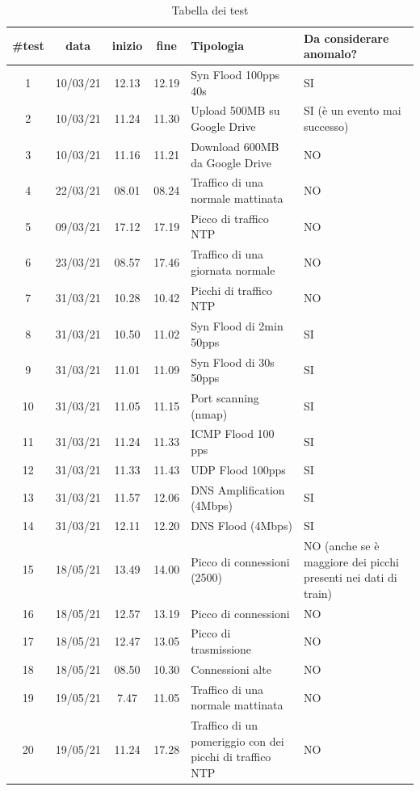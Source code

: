\FloatBarrier
\begin{table}
    \begin{tabularx}{\textwidth}{||c c c c X X||} 
        \hline
        \#test & data  & inizio & fine & Tipologia & Da considerare anomalo? \\ [0.5ex] 
        \hline\hline
        1 & 10/03/21 & 12.13 & 12.19 & Syn Flood 100pps 40s & SI\\ 
        \hline
        2 & 10/03/21 & 11.24 & 11.30
         & Upload 500MB su Google Drive & SI (è un evento mai successo)\\ 
        \hline
        3 & 10/03/21 & 11.16 & 11.21 & Download 600MB da Google Drive & NO\\ 
        \hline 
        4 & 22/03/21 & 08.01 & 08.24 & Traffico di una normale mattinata & NO\\
        \hline
        5 & 09/03/21 & 17.12 & 17.19 & Picco di traffico NTP & NO\\
        \hline
        6 & 23/03/21 & 08.57 & 17.46
         & Traffico di una giornata normale & NO\\ 
        \hline
        7 & 31/03/21 & 10.28 & 10.42 & Picchi di traffico NTP & NO\\ 
        \hline 
        8 & 31/03/21 & 10.50 & 11.02 & Syn Flood di 2min 50pps & SI\\
        \hline
        9 & 31/03/21 & 11.01 & 11.09 & Syn Flood di 30s 50pps & SI\\        
        \hline
        10 & 31/03/21 & 11.05 & 11.15 & Port scanning (nmap) & SI\\
        \hline
        11 & 31/03/21 & 11.24 & 11.33 & ICMP Flood 100 pps & SI\\
        \hline
        12 & 31/03/21 & 11.33 & 11.43
         & UDP Flood 100pps & SI\\ 
        \hline
        13 & 31/03/21 & 11.57 & 12.06 & DNS Amplification (4Mbps) & SI\\ 
        \hline 
        14 & 31/03/21 & 12.11 & 12.20 & DNS Flood (4Mbps) & SI\\
        \hline
        15 & 18/05/21 & 13.49 & 14.00 & Picco di connessioni (2500) & NO (anche se è maggiore dei picchi presenti nei dati di train) \\ %
        \hline 
        16 & 18/05/21 & 12.57 & 13.19 & Picco di connessioni & NO\\        
        \hline
        17 & 18/05/21 & 12.47 & 13.05 & Picco di trasmissione & NO\\        
        \hline
        18 & 18/05/21 & 08.50 & 10.30 & Connessioni alte & NO\\
        \hline
        19 & 19/05/21 & 7.47 & 11.05 & Traffico di una normale mattinata & NO\\ 
        \hline
        20 & 19/05/21 & 11.24 & 17.28 & Traffico di un pomeriggio con dei picchi di traffico NTP & NO\\ 
        \hline
    \end{tabularx}
    \caption{Tabella dei test}
    \label{table:test}
\end{table}
\FloatBarrier

